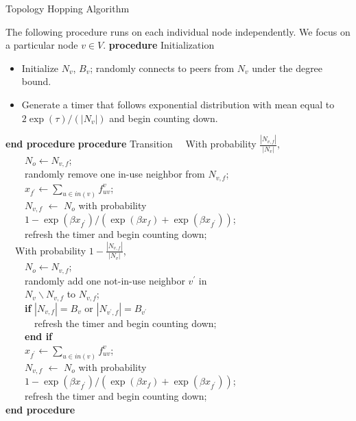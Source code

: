\documentclass[10pt,conference]{IEEEtran}
\begin{document}
\begin{algorithm}[hbt!]
\caption{Topology Hopping Algorithm}
\label{alg:ma}
\begin{algorithmic}[1]
\STATE The following procedure runs on each individual node independently. We focus on a particular node $v\in V$.
\STATE \textbf{procedure} Initialization
\begin{itemize}
\item Initialize $N_v$, $B_v$; randomly connects to peers from $N_v$ under the degree bound.
\item Generate a timer that follows exponential distribution with mean equal to $2\exp(\tau)/(|N_{v}|)$ and begin counting down.
\end{itemize}
\STATE \textbf{end procedure}
\STATE {$\,$}
\STATE \textbf{procedure} Transition
\STATE $\quad$With probability $\frac{|N_{v,f}|}{|N_{v}|}$,\\
\STATE $\quad$$\quad$$N_o\leftarrow N_{v,f}$;\\
\STATE $\quad$$\quad$randomly remove one in-use neighbor from $N_{v,f}$;\\
\STATE $\quad$$\quad$$x_{f^{'}}\leftarrow\sum_{u\in in(v)}f_{uv}^{v}$;\\
\STATE $\quad$$\quad$$N_{v,f}$ $\leftarrow$ $N_o$ with probability\\
       $\quad$$\quad$$1-{\exp(\beta x_{f^{'}})}/{\left(\exp(\beta x_f)+\exp(\beta x_{f^{'}})\right)}$;\\
\STATE $\quad$$\quad$refresh the timer and begin counting down;\\
\STATE $\quad$With probability $1-\frac{|N_{v,f}|}{|N_{v}|}$,\\
\STATE $\quad$$\quad$$N_o\leftarrow N_{v,f}$;\\
\STATE $\quad$$\quad$randomly add one not-in-use neighbor $v^{'}$ in\\
       $\quad$$\quad$$N_{v}\backslash N_{v,f}$ to $N_{v,f}$;\\
\STATE $\quad$$\quad$\textbf{if} $|N_{v,f}|=B_{v}$ or $|N_{v^{'},f}|=B_{v^{'}}$\\
\STATE $\quad$$\quad$$\quad$refresh the timer and begin counting down;\\
\STATE $\quad$$\quad$\textbf{end if}\\
\STATE $\quad$$\quad$$x_{f^{'}}\leftarrow\sum_{u\in in(v)}f_{uv}^{v}$;\\
\STATE $\quad$$\quad$$N_{v,f}$ $\leftarrow$ $N_o$ with probability\\
       $\quad$$\quad$$1-{\exp(\beta x_{f^{'}})}/{\left(\exp(\beta x_f)+\exp(\beta x_{f^{'}})\right)}$;\\
\STATE $\quad$$\quad$refresh the timer and begin counting down;\\
\STATE \textbf{end procedure}
\end{algorithmic}
\end{algorithm}
\end{document}
